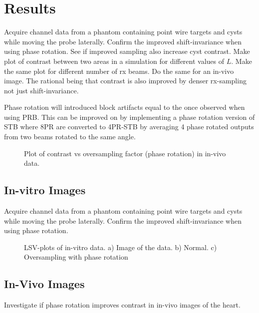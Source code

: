 \documentclass[journal]{IEEEtran}
\newcommand{\img}{img/}
\begin{document}
\section{Results}\label{sec:res}

Acquire channel data from a phantom containing point wire targets and cysts while moving the probe laterally. Confirm the improved shift-invariance when using phase rotation. See if improved sampling also increase cyst contrast.
Make plot of contrast between two areas in a simulation for different values of $L$. Make the same plot for different number of rx beams. Do the same for an in-vivo image. The rational being that contrast is also improved by denser rx-sampling not just shift-invariance. 

Phase rotation will introduced block artifacts equal to the once observed when using PRB. This can be improved on by implementing a phase rotation version of STB where 8PR are converted to 4PR-STB by averaging 4 phase rotated outputs from two beams rotated to the same angle. 

\begin{figure}\caption{Plot of contrast vs oversampling factor (phase rotation) in in-vivo data.}
\end{figure}

\subsection{In-vitro Images}
Acquire channel data from a phantom containing point wire targets and cysts while moving the probe laterally. Confirm the improved shift-invariance when using phase rotation. 

\begin{figure*}[!t]
\centerline{
\hfill{}
\hfill{}
}
\caption{LSV-plots of in-vitro data. a) Image of the data. b) Normal. c) Oversampling with phase rotation}
\label{fig:das}
\end{figure*}

\subsection{In-Vivo Images}
Investigate if phase rotation improves contrast in in-vivo images of the heart.
\end{document}
